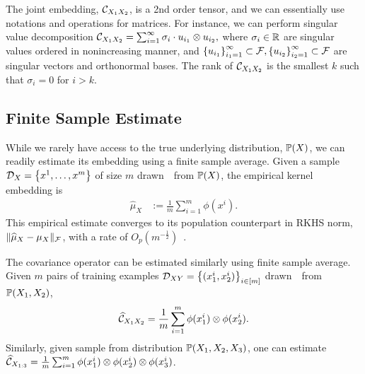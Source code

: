 \documentclass{article}
\newcommand{\hmu}{\widehat{\mu}}
\begin{document}
The joint embedding, $\mathcal{C}_{X_1 X_2}$, is a 2nd order tensor, and we can essentially use notations and operations for matrices. For instance, we can perform singular value decomposition
$
    \mathcal{C}_{X_1X_2} = \sum_{i=1}^{\infty} \sigma_i \cdot u_{i_1} \otimes u_{i_2},
$
where $\sigma_i \in \mathbb{R}$ are singular values ordered in nonincreasing manner, and $\left\{u_{i_1}\right\}_{i_1=1}^{\infty} \subset \mathcal{F}, \left\{u_{i_2}\right\}_{i_2=1}^{\infty} \subset \mathcal{F}$ are singular vectors and orthonormal bases. The rank of $\mathcal{C}_{X_1X_2}$ is the smallest $k$ such that $\sigma_i = 0$ for $i > k$.

\vspace{-3mm}
\subsection{Finite Sample Estimate}
\vspace{-3mm}

While we rarely have access to the true underlying distribution, $\mathbb{P}(X)$,
we can readily estimate its embedding using a finite sample average. Given a sample $\mathcal{D}_{X} = \left\{x^1, \ldots, x^m\right\}$ of size $m$ drawn~\iid~from $\mathbb{P}(X)$, the empirical kernel embedding is
\begin{align}
    \hmu_{X} &:= \frac{1}{m} \sum\nolimits_{i=1}^m \phi(x^i). \label{eq:empirical_embedding}
\end{align}
This empirical estimate converges to its population counterpart in RKHS norm, $\|\hmu_X - \mu_X \|_{\Fcal}$, with a rate of $O_p(m^{-\frac{1}{2}})$~\cite{SmoGreSonSch07}.

The covariance operator can be estimated similarly using finite sample average.
Given $m$ pairs of training examples $\mathcal{D}_{XY}=\left\{(x_1^i,x_2^i)\right\}_{i\in [m]}$ drawn~\iid~from $\mathbb{P}(X_1,X_2)$,
\begin{align}
 \widehat {\mathcal{C}}_{X_1X_2} =\frac{1}{m}\sum_{i=1}^m \phi(x_1^i) \otimes \phi(x_2^i). \label{eq:empirical_covariance}
\end{align}
Similarly, given sample from distribution $\mathbb{P}(X_1,X_2,X_3)$, one can estimate $\widehat {\mathcal{C}}_{X_{1:3}} = \frac{1}{m} \sum_{i = 1}^m \phi(x_1^i) \otimes \phi(x_2^i) \otimes \phi(x_3^i)$.
\end{document}
